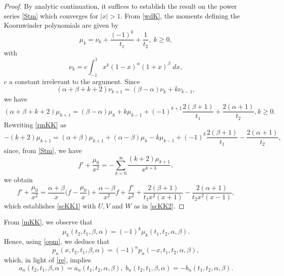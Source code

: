 \documentclass[10pt, reqno]{amsart}
\numberwithin{equation}{section}
\numberwithin{equation}{section}
\begin{document}
\begin{proof}
By analytic continuation, it suffices to establish the result on the power series \eqref{Stm} which converges for $\vert x\vert >1$.  From \eqref{wdK},
the moments defining the Koornwinder polynomials are given by 
\begin{equation}
\mu_k=\nu_{k}+\frac{(-1)^k}{t_1}+\frac{1}{t_2},\; k\geq 0,\label{mKK}
\end{equation}
with 
\begin{equation*}
\nu_k=c\int_{-1}^1 x^k(1-x)^{\alpha}(1+x)^{\beta}\; dx,
\end{equation*}
$c$ a constant irrelevant to the argument. Since
\begin{equation*}
(\alpha+\beta+k+2)\nu_{k+1}=(\beta-\alpha)\nu_k+k\nu_{k-1},
\end{equation*}
we have
\begin{equation}
(\alpha+\beta+k+2)\mu_{k+1}=(\beta-\alpha)\mu_k+k\mu_{k-1}+(-1)^{k+1}\frac{2(\beta+1)}{t_1}+\frac{2(\alpha+1)}{t_2}, k\geq 0.\label{rmKK}
\end{equation}
Rewriting \eqref{rmKK} as
\begin{equation*}
-(k+2)\mu_{k+1}=(\alpha+\beta)\mu_{k+1}+(\alpha-\beta)\mu_k-k\mu_{k-1}
+(-1)^k\frac{2(\beta+1)}{t_1}-\frac{2(\alpha+1)}{t_2},
\end{equation*}
since, from \eqref{Stm}, we have
\begin{equation*}
f'+\frac{\mu_0}{x^2}=-\sum_{k=0}^{\infty}\frac{(k+2)\mu_{k+1}}{x^{k+3}},
\end{equation*}
we obtain
\begin{equation*}
f'+\frac{\mu_0}{x^2}=\frac{\alpha+\beta}{x}\Big(f-\frac{\mu_0}{x}\Big)+\frac{\alpha-\beta}{x^2}f+\frac{f'}{x^2}
+\frac{2(\beta+1)}{t_1 x^2(x+1)}-\frac{2(\alpha+1)}{t_2 x^2(x-1)},
\end{equation*}
which establishes \eqref{scKK1} with $U,V$ and $W$ as in \eqref{scKK2}.
\end{proof}

From \eqref{mKK}, we observe that 
\begin{equation*}
\mu_k(t_2,t_1,\beta,\alpha)=(-1)^k\mu_k(t_1,t_2,\alpha,\beta).
\end{equation*}
Hence, using \eqref{opm}, we deduce that 
\begin{equation*}
p_n(x,t_2,t_1,\beta,\alpha)=(-1)^np_n(-x,t_1,t_2,\alpha,\beta),
\end{equation*}
which, in light of \eqref{re}, implies 
\begin{equation}
a_n(t_2,t_1,\beta,\alpha)=a_n(t_1,t_2,\alpha,\beta),\; b_n(t_2,t_1,\beta,\alpha)=-b_n(t_1,t_2,\alpha,\beta).\label{ptalbe}
\end{equation}
\end{document}

